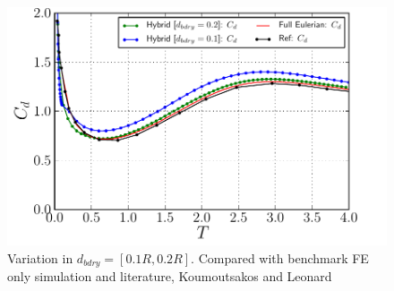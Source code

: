 %     

	
	\begin{figure}[!p]
	\centering
	\includegraphics[width=0.6\linewidth]{./figures/validation/isc/hybrid_ISC_drag_comparison_dbdry2.pdf}
	\caption{Variation in $d_{bdry} = [0.1R, 0.2R]$. Compared with benchmark FE only simulation and literature, Koumoutsakos and Leonard \cite{Koumoutsakos1995a}}
	\label{fig:hybrid_ISC_parameterSensitivity_dbdry}
	\end{figure}	
	

